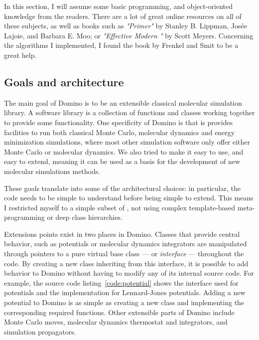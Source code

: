 \documentclass[thesis]{subfiles}
\begin{document}
In this section, I will assume some basic programming, \cxx and object-oriented
knowledge from the readers. There are a lot of great online resources on all of
these subjects, as well as books such as \emph{"\cxx Primer"} by Stanley B.
Lippman, Josée Lajoie, and Barbara E. Moo; or \emph{"Effective Modern \cxx"} by
Scott Meyers. Concerning the algorithms I implemented, I found the book by
Frenkel and Smit\cite{Frenkel2002} to be a great help.

\subsection{Goals and architecture}

The main goal of Domino is to be an extensible classical molecular simulation
library. A software library is a collection of functions and classes working
together to provide some functionality. One specificity of Domino is that is
provides facilities to run both classical Monte Carlo, molecular dynamics and
energy minimization simulations, where most other simulation software only offer
either Monte Carlo or molecular dynamics. We also tried to make it easy to use,
and easy to extend, meaning it can be used as a basis for the development of new
molecular simulations methods.

These goals translate into some of the architectural choices: in particular, the
code needs to be simple to understand before being simple to extend. This means
I restricted myself to a simple subset of \cxx, not using complex template-based
meta-programming or deep class hierarchies.

Extensions points exist in two places in Domino. Classes that provide central
behavior, such as potentials or molecular dynamics integrators are manipulated
through pointers to a pure virtual base class --- or \emph{interface} ---
throughout the code. By creating a new class inheriting from this interface, it
is possible to add behavior to Domino without having to modify any of its
internal source code. For example, the source code listing~\ref{code:potential}
shows the interface used for potentials and the implementation for Lennard-Jones
potentials. Adding a new potential to Domino is as simple as creating a new
class and implementing the corresponding required functions. Other extensible
parts of Domino include Monte Carlo moves, molecular dynamics thermostat and
integrators, and simulation propagators.
\end{document}
